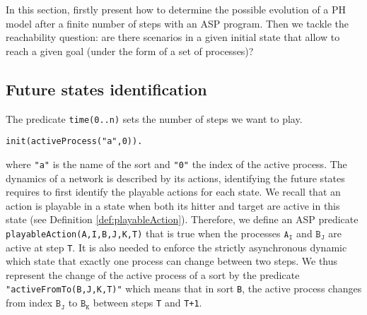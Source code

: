 
In this section, firstly present how to determine the possible evolution of a PH model after a finite number of steps with an ASP program.
Then we tackle the reachability question: are there scenarios in a given initial state
that allow to reach a given goal (under the form of a set of processes)?

\subsection{Future states identification}
%
The predicate \texttt{time(0..n)} sets the number of steps we want to play.
%
\begin{lstlisting}
init(activeProcess("a",0)).
\end{lstlisting}
where \texttt{"a"} is the name of the sort and \texttt{"0"} the index of the active process.
The dynamics of a network is described by its actions,
identifying the future states requires to first identify the playable actions for each state.
We recall that an action is playable in a state when both its hitter and target are active in this state (see Definition \ref{def:playableAction}).
Therefore, we define an ASP predicate \texttt{playableAction(A,I,B,J,K,T)} that is true
when the processes $\texttt{A}_\texttt{I}$ and $\texttt{B}_\texttt{J}$ are active at step \texttt{T}.
 
It is also needed to enforce the strictly asynchronous dynamic
which state that exactly one process can change between two steps.
We thus represent the change of the active process of a sort
by the predicate \texttt{"activeFromTo(B,J,K,T)"}
which means that in sort \texttt{B}, the active process changes from index $\texttt{B}_\texttt{J}$ to $\texttt{B}_\texttt{K}$ between steps \texttt{T} and \texttt{T+1}.
 
%
